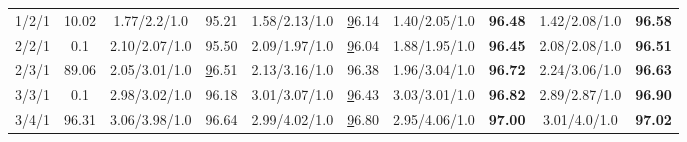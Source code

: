\begin{table}[t]
\begin{adjustbox}{max width=0.48\textwidth}
\begin{threeparttable}
\begin{tabular}{c|c|cc|cc|cc|cc}
{  1/2/1}                                                                              & {  10.02}                                                                & {  1.77/2.2/1.0}                      & {  95.21}                            & {  1.58/2.13/1.0}                    & {  {\ul 96.14}}                     & {  1.40/2.05/1.0}                    & {\color[HTML]{9B9B9B} \textbf{96.48}}                  & {  1.42/2.08/1.0}                   & {  \textbf{96.58}}                  \\
{  2/2/1}                                                                              & {  0.1}                                                                  & {  2.10/2.07/1.0}                     & {  95.50}                            & {  2.09/1.97/1.0}                    & {  {\ul 96.04}}                     & {  1.88/1.95/1.0}                    & {\color[HTML]{9B9B9B} \textbf{96.45}}                  & {  2.08/2.08/1.0}                   & {  \textbf{96.51}}                  \\
{  2/3/1}                                                                              & {  89.06}                                                                & {  2.05/3.01/1.0}                     & {  {\ul 96.51}}                      & {  2.13/3.16/1.0}                    & {  96.38}                           & {  1.96/3.04/1.0}                    & {  \textbf{96.72}}                  & {  2.24/3.06/1.0}                   & {\color[HTML]{9B9B9B} \textbf{96.63}}                  \\
{  3/3/1}                                                                              & {  0.1}                                                                  & {  2.98/3.02/1.0}                     & {  96.18}                            & {  3.01/3.07/1.0}                    & {  {\ul 96.43}}                     & {  3.03/3.01/1.0}                    & {\color[HTML]{9B9B9B} \textbf{96.82}}                  & {  2.89/2.87/1.0}                   & {  \textbf{96.90}}                  \\
{  3/4/1}                                                                              & {  96.31}                                                                & {  3.06/3.98/1.0}                     & {  96.64}                            & {  2.99/4.02/1.0}                    & {  {\ul 96.80}}                     & {  2.95/4.06/1.0}                    & {\color[HTML]{9B9B9B} \textbf{97.00}}                  & {  3.01/4.0/1.0}                    & {  \textbf{97.02}}                  \\ \bottomrule
\end{tabular}
\end{threeparttable}
\end{adjustbox}
\end{table}
